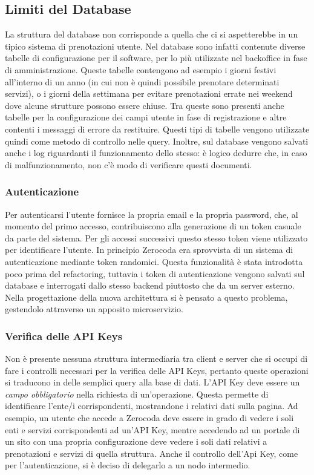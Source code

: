 \subsection{Limiti del Database}
La struttura del database non corrisponde a quella che ci si aspetterebbe in un tipico sistema di prenotazioni utente. Nel database sono infatti contenute diverse tabelle di configurazione per il software, per lo più utilizzate nel backoffice in fase di amministrazione. Queste tabelle contengono ad esempio i giorni festivi all'interno di un anno (in cui non è quindi possibile prenotare determinati servizi), o i giorni della settimana per evitare prenotazioni errate nei weekend dove alcune strutture possono essere chiuse. Tra queste sono presenti anche tabelle per la configurazione dei campi utente in fase di registrazione e altre contenti i messaggi di errore da restituire. Questi tipi di tabelle vengono utilizzate quindi come metodo di controllo nelle query. Inoltre, sul database vengono salvati anche i log riguardanti il funzionamento dello stesso: è logico dedurre che, in caso di malfunzionamento, non c'è modo di verificare questi documenti.

\subsubsection{Autenticazione}
 Per autenticarsi l'utente fornisce la propria email e la propria password, che, al momento del primo accesso, contribuiscono alla generazione di un token casuale da parte del sistema. Per gli accessi successivi questo stesso token viene utilizzato per identificare l'utente. In principio Zerocoda era sprovvista di un sistema di autenticazione mediante token randomici. Questa funzionalità è stata introdotta poco prima del refactoring, tuttavia i token di autenticazione vengono salvati sul database e interrogati dallo stesso backend piuttosto che da un server esterno. Nella progettazione della nuova architettura si è pensato a questo problema, gestendolo attraverso un apposito microservizio.

\subsubsection{Verifica delle API Keys}
Non è presente nessuna struttura intermediaria tra client e server che si occupi di fare i controlli necessari per la verifica delle API Keys, pertanto queste operazioni si traducono in delle semplici query alla base di dati. L'API Key deve essere un \emph{campo obbligatorio} nella richiesta di un'operazione. Questa permette di identificare l'ente/i corrispondenti, mostrandone i relativi dati sulla pagina. Ad esempio, un utente che accede a Zerocoda deve essere in grado di vedere i soli enti e servizi corrispondenti ad un'API Key, mentre accedendo ad un portale di un sito con una propria configurazione deve vedere i soli dati relativi a prenotazioni e servizi di quella struttura. Anche il controllo dell'Api Key, come per l'autenticazione, si è deciso di delegarlo a un nodo intermedio.

